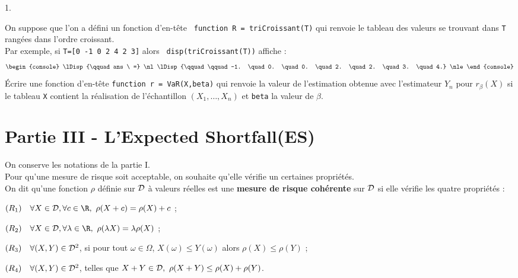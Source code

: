 \begin{noliste}{1.}
  \item On suppose que l'on a défini un fonction d'en-tête {\tt 
  function R = triCroissant(T)} qui renvoie le tableau des valeurs 
  se trouvant dans {\tt T} rangées dans l'ordre croissant.\\ 
  Par exemple, si {\tt T=[0 -1 0 2 4 2 3]} alors {\tt 
  disp(triCroissant(T))} affiche :
  \[
  \begin{console}
    \lDisp{\qquad ans \ =} \nl %
    \lDisp{\qquad \qquad -1. \quad 0. \quad 0. \quad 2. \quad 2. \quad 
    3. \quad 4.} \nle %
  \end{console}
  \]
  Écrire une fonction \Scilab{} d'en-tête {\tt function r = 
  VaR(X,beta)} qui renvoie la valeur de l'estimation obtenue avec 
  l'estimateur $Y_n$ pour $r_\beta(X)$ si le tableau {\tt X} 
  contient la réalisation de l'échantillon $(X_1, \ldots, X_n)$ et 
  {\tt beta} la valeur de $\beta$. 
  
  
\end{noliste}






\section*{Partie III - L'\og Expected Shortfall\fg (ES)}
\noindent
On conserve les notations de la partie I.\\
Pour qu'une mesure de risque soit acceptable, on souhaite qu'elle 
vérifie un certaines propriétés.\\
On dit qu'une fonction $\rho$ définie sur ${\cal D}$ à valeurs 
réelles est une {\bf mesure de risque cohérente} sur ${\cal D}$ 
si elle vérifie les quatre propriétés :
\begin{noliste}{}
  \item $(R_1) \quad \forall X \in {\cal D}, \forall c \in \R, \
  \rho(X+c)=\rho(X)+c$ ;
  
  \item $(R_2) \quad \forall X \in {\cal D}, \forall \lambda \in 
  \R, \ \rho(\lambda X)=\lambda \rho(X)$ ;
  
  \item $(R_3) \quad \forall(X,Y) \in {\cal D}^2$, si pour tout 
  $\omega \in \Omega$, $X(\omega) \leq Y(\omega)$ alors $\rho(X) 
  \leq \rho(Y)$ ;
  
  \item $(R_4) \quad \forall(X,Y) \in {\cal D}^2$, telles que $X+Y 
  \in {\cal D}, \ \rho(X+Y) \leq \rho(X)+\rho(Y)$.
\end{noliste}

